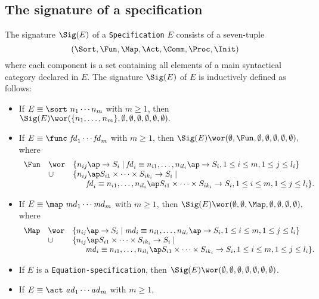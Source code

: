 \documentclass[twoside,fleqn,a4paper,dvips]{article}
\begin{document}
\subsection{The signature of a specification}
\begin{defn}
The signature $\Sig(E)$ of a {\tt Specification} $E$ consists of a
seven-tuple \[(\Sort,\Fun,\Map,\Act,\Comm,\Proc,\Init)\] where
each component is a set containing all elements of a main syntactical category
declared in $E$.
The signature $\Sig(E)$ of $E$ is inductively defined as follows:
\newcommand{\fd}{{\it fd}}
\newcommand{\md}{{\it md}}
\newcommand{\pe}{{\it pe}}
\newcommand{\ad}{{\it ad}}
\begin{itemize}
\item
If $E\equiv \sort~n_1\cdots n_m$ with $m\geq 1$,
then
$\Sig(E)\wor(\{n_1,\ldots,n_m\},\emptyset,\emptyset,\emptyset,
\emptyset,\emptyset,\emptyset).$
\item
If $E\equiv
\func~\fd_1\cdots \fd_m$ with $m\geq 1$,
then
$\Sig(E)\wor(\emptyset,\Fun,
\emptyset,\emptyset,
\emptyset,\emptyset,\emptyset),$
where \[\begin{array}{lll}
\Fun &\wor&
\{n_{ij}\ap \rightarrow S_i\mid \fd_i\equiv
n_{i1},\ldots,n_{il_i}\ap \rightarrow S_i, 1\leq i\leq m, 1\leq j\leq
l_i\}\\
&\cup&\{n_{ij}\ap S_{i1}\times\cdots\times S_{ik_i}\rightarrow S_i\mid\\
&&~~~~~\fd_i\equiv
n_{i1},\ldots,n_{il_i}\ap S_{i1}\times\cdots\times S_{ik_i}\rightarrow
S_i, 1\leq i\leq
m, 1\leq j\leq l_i\}.
\end{array}
\]
\item
If $E\equiv
\map~\md_1\cdots \md_m$ with $m\geq 1$,
then
$\Sig(E)\wor(\emptyset,\emptyset,\Map, \emptyset,\emptyset,
\emptyset,\emptyset),$
where \[\begin{array}{lll}
\Map &\wor&
\{n_{ij}\ap \rightarrow S_i\mid \md_i\equiv
n_{i1},\ldots,n_{il_i}\ap \rightarrow S_i, 1\leq i\leq m, 1\leq j\leq
l_i\}\\
&\cup&\{n_{ij}\ap S_{i1}\times\cdots\times S_{ik_i}\rightarrow S_i\mid\\
&&~~~~~\md_i\equiv
n_{i1},\ldots,n_{il_i}\ap S_{i1}\times\cdots\times S_{ik_i}\rightarrow
S_i, 1\leq i\leq
m, 1\leq j\leq l_i\}.
\end{array}
\]
\item
If $E$ is a {\tt Equation-specification},
then
$\Sig(E)\wor(\emptyset,\emptyset,\emptyset,\emptyset,\emptyset,\emptyset,\emptyset)$.
\item
If $E\equiv
\act~\ad_1\cdots \ad_m$ with $m\geq 1$,

\end{itemize}
\end{defn}
\end{document}
